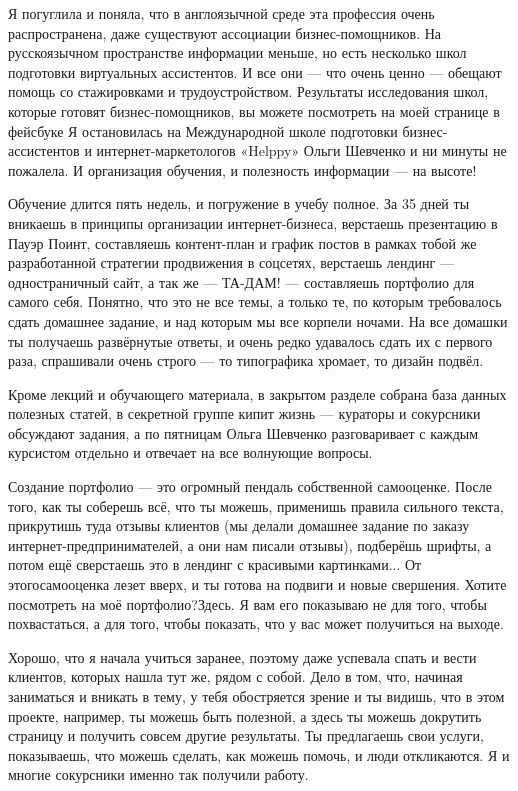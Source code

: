 Я погуглила и поняла, что в англоязычной среде эта профессия очень распространена, даже существуют ассоциации бизнес-помощников.
На русскоязычном пространстве информации меньше, но есть несколько школ подготовки виртуальных ассистентов.
И все они --- что очень ценно --- обещают помощь со стажировками и трудоустройством. Результаты исследования школ, которые готовят бизнес-помощников, вы можете посмотреть на моей странице в фейсбуке Я остановилась на Международной школе подготовки бизнес-ассистентов и интернет-маркетологов «Helppy» Ольги Шевченко и ни минуты не пожалела. И организация обучения, и полезность информации --- на высоте!

Обучение длится пять недель, и погружение в учебу полное. За 35 дней ты вникаешь в принципы организации интернет-бизнеса, верстаешь презентацию в Пауэр Поинт, составляешь контент-план и график постов в рамках тобой же разработанной стратегии продвижения в соцсетях, верстаешь лендинг --- одностраничный сайт, а так же --- ТА-ДАМ! --- составляешь портфолио для самого себя. Понятно, что это не все темы, а только те, по которым требовалось сдать домашнее задание, и над которым мы все корпели ночами. На все домашки ты получаешь развёрнутые ответы, и очень редко удавалось сдать их с первого раза, спрашивали очень строго --- то типографика хромает, то дизайн подвёл.

Кроме лекций и обучающего материала, в закрытом разделе собрана база данных полезных статей, в секретной группе кипит жизнь --- кураторы и сокурсники обсуждают задания, а по пятницам Ольга Шевченко разговаривает с каждым курсистом отдельно и отвечает на все волнующие вопросы.

Создание портфолио --- это огромный пендаль собственной самооценке. После того, как ты соберешь всё, что ты можешь, применишь правила сильного текста, прикрутишь туда отзывы клиентов (мы делали домашнее задание по заказу интернет-предпринимателей, а они нам писали отзывы), подберёшь шрифты, а потом ещё сверстаешь это в лендинг с красивыми картинками... От этогосамооценка лезет вверх, и ты готова на подвиги и новые свершения. Хотите посмотреть на моё портфолио?Здесь. Я вам его показываю не для того, чтобы похвастаться, а для того, чтобы показать, что у вас может получиться на выходе.

Хорошо, что я начала учиться заранее, поэтому даже успевала спать и вести клиентов, которых нашла тут же, рядом с собой. Дело в том, что, начиная заниматься и вникать в тему, у тебя обостряется зрение и ты видишь, что в этом проекте, например, ты можешь быть полезной, а здесь ты можешь докрутить страницу и получить совсем другие результаты. Ты предлагаешь свои услуги, показываешь, что можешь сделать, как можешь помочь, и люди откликаются. Я и многие сокурсники именно так получили работу.

